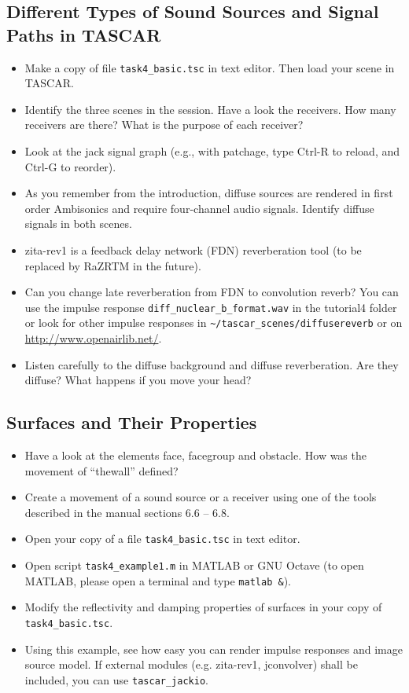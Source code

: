 \documentclass[11pt,a4paper,twoside]{article}
\begin{document}
\subsection*{Different Types of Sound Sources and Signal Paths in TASCAR}
\begin{itemize}
\item Make a copy of file \verb!task4_basic.tsc! in text editor. Then load
  your scene in TASCAR.
\item Identify the three scenes in the session. Have a look the
  receivers. How many receivers are there? What is the purpose of each
  receiver?
\item Look at the jack signal graph (e.g., with patchage, type Ctrl-R
  to reload, and Ctrl-G to reorder).
\item As you remember from the introduction, diffuse sources are
  rendered in first order Ambisonics and require four-channel audio
  signals. Identify diffuse signals in both scenes.
\item zita-rev1 is a feedback delay network (FDN) reverberation tool
  (to be replaced by RaZRTM in the future).
\item Can you change late reverberation from FDN to convolution
  reverb? You can use the impulse response
  \verb!diff_nuclear_b_format.wav!  in the tutorial4 folder or look
  for other impulse responses in \verb!~/tascar_scenes/diffusereverb!
  or on \url{http://www.openairlib.net/}.
\item Listen carefully to the diffuse background and diffuse
  reverberation. Are they diffuse?  What happens if you move your
  head?
\end{itemize}

\subsection*{Surfaces and Their Properties}
  
\begin{itemize}
\item Have a look at the elements face, facegroup and obstacle. How
  was the movement of ``thewall'' defined?
\item Create a movement of a sound source or a receiver using one of
  the tools described in the manual sections 6.6 – 6.8.
\item Open your copy of a file \verb!task4_basic.tsc! in text editor.
\item Open script \verb!task4_example1.m! in MATLAB or GNU Octave (to
  open MATLAB, please open a terminal and type \verb!matlab &!).
\item Modify the reflectivity and damping properties of surfaces in
  your copy of \verb!task4_basic.tsc!.
\item Using this example, see how easy you can render impulse
  responses and image source model. If external modules
  (e.g. zita-rev1, jconvolver) shall be included, you can use
  \verb!tascar_jackio!.
\end{itemize}


\fi
\end{document}
